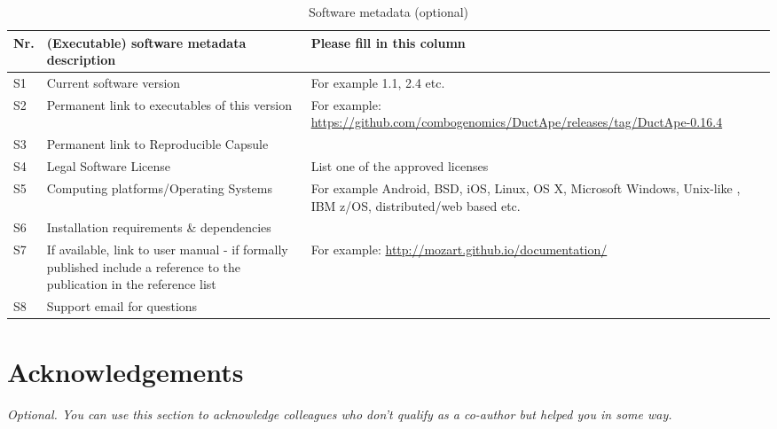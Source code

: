 \documentclass[preprint,12pt, a4paper]{elsarticle}
\begin{document}
\begin{table}[!h]
\begin{tabular}{|l|p{6.5cm}|p{6.5cm}|}
\hline
\textbf{Nr.} & \textbf{(Executable) software metadata description} & \textbf{Please fill in this column} \\
\hline
S1 & Current software version & For example 1.1, 2.4 etc. \\
\hline
S2 & Permanent link to executables of this version  & For example: \url{https://github.com/combogenomics/DuctApe/releases/tag/DuctApe-0.16.4} \\
\hline
S3  & Permanent link to Reproducible Capsule & \\
\hline
S4 & Legal Software License & List one of the approved licenses \\
\hline
S5 & Computing platforms/Operating Systems & For example Android, BSD, iOS, Linux, OS X, Microsoft Windows, Unix-like , IBM z/OS, distributed/web based etc. \\
\hline
S6 & Installation requirements \& dependencies & \\
\hline
S7 & If available, link to user manual - if formally published include a reference to the publication in the reference list & For example: \url{http://mozart.github.io/documentation/} \\
\hline
S8 & Support email for questions & \\
\hline
\end{tabular}
\caption{Software metadata (optional)}
\label{executabelMetadata}
\end{table}








\section*{Acknowledgements}
\label{}
\textit{Optional. You can use this section to acknowledge colleagues who don’t qualify as a co-author but helped you in some way. }




\end{document}
